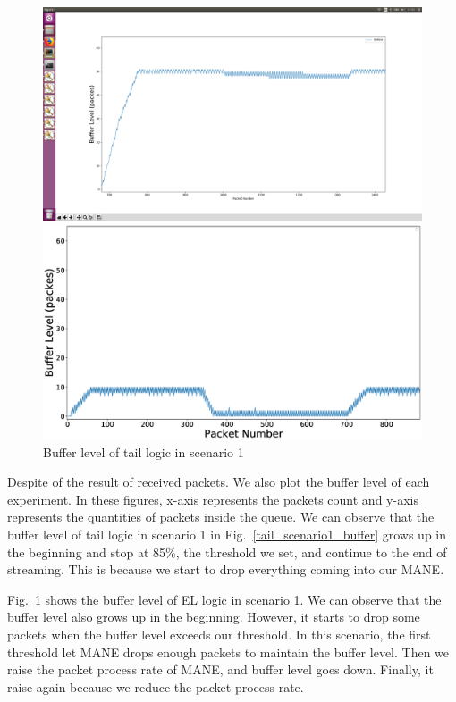 \begin{subsection}
\begin{figure}[tbh]
	\centering
	\begin{minipage}[t]{0.24\textwidth}
	\centering
    \includegraphics[width=\textwidth]{fig/tail_scenario1_buffer.png}
	\caption{Buffer level of tail logic in scenario 1}
	\label{tail_scenario1_buffer} 
	\end{minipage}
	\hfill\begin{minipage}[t]{0.23\textwidth}
	\centering
	\includegraphics[width=\textwidth]{fig/EL_scenario1_buffer.eps}
	\caption{Buffer level of tail logic in scenario 1}
	\label{EL_scenario1_buffer} 
	\end{minipage}
	\vspace{-0.1cm}
\end{figure}

Despite of the result of received packets. We also plot the buffer level of each experiment. In these figures, x-axis represents the packets count and y-axis represents the quantities of packets inside the queue. We can observe that the buffer level of tail logic in scenario 1 in Fig.~\ref{tail_scenario1_buffer} grows up in the beginning and stop at 85\%, the threshold we set, and continue to the end of streaming. This is because we start to drop everything coming into our MANE.

Fig.~\ref{EL_scenario1_buffer} shows the buffer level of EL logic in scenario 1. We can observe that the buffer level also grows up in the beginning. However, it starts to drop some packets when the buffer level exceeds our threshold. In this scenario, the first threshold let MANE drops enough packets to maintain the buffer level. Then we raise the packet process rate of MANE, and buffer level goes down. Finally, it raise again because we reduce the packet process rate.
\end{subsection}
